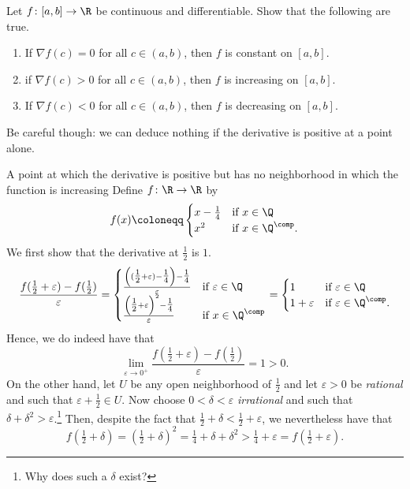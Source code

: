 \begin{exr}{}{}
Let $f\colon [a,b]\rightarrow \R$ be continuous and differentiable.  Show that the following are true.
\begin{enumerate}
\item If $\nabla f(c)=0$ for all $c\in (a,b)$, then $f$ is constant on $[a,b]$.
\item if $\nabla f(c)>0$ for all $c\in (a,b)$, then $f$ is increasing on $[a,b]$.
\item If $\nabla f(c)<0$ for all $c\in (a,b)$, then $f$ is decreasing on $[a,b]$.
\end{enumerate}
\end{exr}
Be careful though:  we can deduce nothing if the derivative is positive at a point alone.
\begin{exm}{A point at which the derivative is positive but has no neighborhood in which the function is increasing}{}
Define $f\colon \R \rightarrow \R$ by
\begin{equation}
f(x)\coloneqq \begin{cases}x-\tfrac{1}{4} & \text{if }x\in \Q \\ x^2 & \text{if }x\in \Q ^{\comp}.\end{cases}
\end{equation}
We first show that the derivative at $\frac{1}{2}$ is $1$.
\begin{equation}
\frac{f(\tfrac{1}{2}+\varepsilon )-f(\tfrac{1}{2})}{\varepsilon}=\begin{cases}\frac{\left( (\tfrac{1}{2}+\varepsilon )-\tfrac{1}{4}\right) -\tfrac{1}{4}}{\varepsilon} & \text{if }\varepsilon \in \Q \\ \frac{\left( \tfrac{1}{2}+\varepsilon \right) ^2-\tfrac{1}{4}}{\varepsilon} & \text{if }x\in \Q ^{\comp}\end{cases}=\begin{cases}1 & \text{if }\varepsilon \in \Q \\ 1+\varepsilon & \text{if }\varepsilon \in \Q ^{\comp}.\end{cases}
\end{equation}
Hence, we do indeed have that
\begin{equation}
\lim _{\varepsilon \to 0^+}\frac{f(\tfrac{1}{2}+\varepsilon )-f(\tfrac{1}{2})}{\varepsilon}=1>0.
\end{equation}
On the other hand, let $U$ be any open neighborhood of $\frac{1}{2}$ and let $\varepsilon >0$ be \emph{rational} and such that $\varepsilon +\frac{1}{2}\in U$.  Now choose $0<\delta <\varepsilon$ \emph{irrational} and such that $\delta +\delta ^2>\varepsilon$.\footnote{Why does such a $\delta$ exist?}  Then, despite the fact that $\frac{1}{2}+\delta <\frac{1}{2}+\varepsilon$, we nevertheless have that
\begin{equation}
f(\tfrac{1}{2}+\delta )=(\tfrac{1}{2}+\delta )^2=\tfrac{1}{4}+\delta +\delta ^2>\tfrac{1}{4}+\varepsilon =f(\tfrac{1}{2}+\varepsilon ).
\end{equation}
\end{exm}

